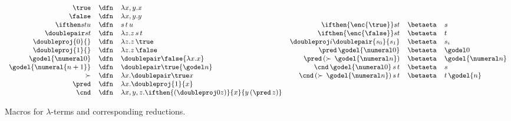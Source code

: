 \begin{figure}[t]
    \centering
 \[
 \small
\begin{array}{rcl}
 \true&\dfn& \lambda x,y. x\\
      \false &\dfn& \lambda x,y. y\\
 \ifthen s t u   & \dfn & s \, t \, u \\
      \doublepair s t & \dfn & \lambda z.z\, s\, t\\
      \doubleproj{0}{} &\dfn&  \lambda z. z \, \true \\
         \doubleproj{1}{} &\dfn&  \lambda z. z \, \false \\
  \godel {\numeral 0} & \dfn & \doublepair \false  {\lambda x.x}   \\
    \godel {\numeral{n+1}} &\dfn  & \doublepair \true {\godel n} \\
    \succ &\dfn & \lambda x. \doublepair \true   x \\
     \pred  &\dfn & \lambda x. \doubleproj{1}{x}  \\
    \cnd &\dfn &\lambda x,y,z. \ifthen{(\doubleproj 0 z)}{x}{y\, ({\pred \, z})}  
      \end{array}
      \begin{array}{rcl}
\ifthen {\enc{\true}} s t & \betaeta & s\\
\ifthen {\enc{\false}} s t & \betaeta & t\\
 \doubleproj i {\doublepair {s_0} {s_1}} & \betaeta & s_i\\
 \pred \, {\godel {\numeral 0}} &\betaeta & \godel 0\\
 \pred\,  {(\succ \, {\godel {\numeral n}})} &\betaeta & \godel {\numeral n}\\
  \cnd \, {\godel {\numeral 0}} \, s \, t &\betaeta & s\\
 \cnd \, {(\succ \, {\godel {\numeral n}})}\, s \, t &\betaeta & t \, \godel{n}\\
 \end{array}
\]

    \caption{Macros for $\lambda$-terms  and corresponding reductions.}
    \label{fig:abbreviation}
\end{figure}







